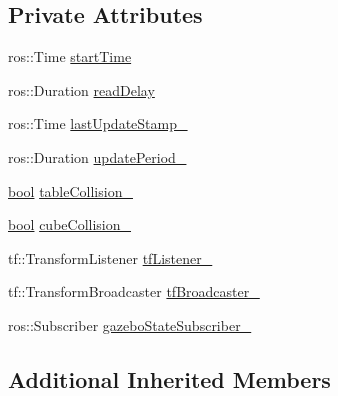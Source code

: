 \subsection*{Private Attributes}
\begin{DoxyCompactItemize}
\item 
ros\+::\+Time \hyperlink{classsm__fetch__six__table__pick__n__sort__1_1_1cl__perception__system_1_1CpSimulatedGazeboPerception_a79d2d2f58266aa29422dd239940c71fe}{start\+Time}
\item 
ros\+::\+Duration \hyperlink{classsm__fetch__six__table__pick__n__sort__1_1_1cl__perception__system_1_1CpSimulatedGazeboPerception_a16ad4f41c70875a0945ab77c3f1edabf}{read\+Delay}
\item 
ros\+::\+Time \hyperlink{classsm__fetch__six__table__pick__n__sort__1_1_1cl__perception__system_1_1CpSimulatedGazeboPerception_a0afb429015393558ba3f7c514da6652c}{last\+Update\+Stamp\+\_\+}
\item 
ros\+::\+Duration \hyperlink{classsm__fetch__six__table__pick__n__sort__1_1_1cl__perception__system_1_1CpSimulatedGazeboPerception_a8d98066880a91100a36380bc1401539f}{update\+Period\+\_\+}
\item 
\hyperlink{classbool}{bool} \hyperlink{classsm__fetch__six__table__pick__n__sort__1_1_1cl__perception__system_1_1CpSimulatedGazeboPerception_a64fe9f7f3b8c9369bab68737872f0929}{table\+Collision\+\_\+}
\item 
\hyperlink{classbool}{bool} \hyperlink{classsm__fetch__six__table__pick__n__sort__1_1_1cl__perception__system_1_1CpSimulatedGazeboPerception_ab0583b0302259d8a1a029effec6d3468}{cube\+Collision\+\_\+}
\item 
tf\+::\+Transform\+Listener \hyperlink{classsm__fetch__six__table__pick__n__sort__1_1_1cl__perception__system_1_1CpSimulatedGazeboPerception_a6700ded264daf9604c5fd5dcef6719c6}{tf\+Listener\+\_\+}
\item 
tf\+::\+Transform\+Broadcaster \hyperlink{classsm__fetch__six__table__pick__n__sort__1_1_1cl__perception__system_1_1CpSimulatedGazeboPerception_a50c30c0e2f479883f292dc27e219253d}{tf\+Broadcaster\+\_\+}
\item 
ros\+::\+Subscriber \hyperlink{classsm__fetch__six__table__pick__n__sort__1_1_1cl__perception__system_1_1CpSimulatedGazeboPerception_a7d54eb0de3f74e1433aacdc98b4c6ea3}{gazebo\+State\+Subscriber\+\_\+}
\end{DoxyCompactItemize}
\subsection*{Additional Inherited Members}



